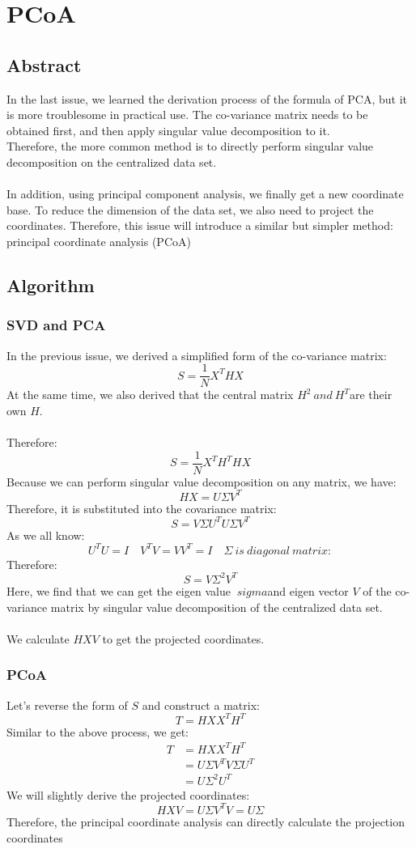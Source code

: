 \documentclass{report}
\begin{document}
\chapter{PCoA}
\section{Abstract}
In the last issue, we learned the derivation process of the formula of PCA, but it is more troublesome in practical use. The co-variance matrix needs to be obtained first, and then apply singular value decomposition to it. \\
Therefore, the more common method is to directly perform singular value decomposition on the centralized data set.\\\\
In addition, using principal component analysis, we finally get a new coordinate base. To reduce the dimension of the data set, we also need to project the coordinates. Therefore, this issue will introduce a similar but simpler method: principal coordinate analysis (PCoA)
\section{Algorithm}
\subsection{SVD and PCA}
In the previous issue, we derived a simplified form of the co-variance matrix:
$$
S=\frac{1}{N} X^T H X
$$
At the same time, we also derived that the central matrix $H^2\ and\ H^T $are their own $H $.\\\\
Therefore:
$$
S=\frac{1}{N} X^T H^T H X
$$
Because we can perform singular value decomposition on any matrix, we have:
$$
HX = U \Sigma V^T
$$
Therefore, it is substituted into the covariance matrix:
$$
S = V \Sigma U^T U \Sigma V^T
$$
As we all know:
$$
U^T U=I \quad V^T V = V V^T= I \quad \Sigma \ is \ diagonal\ matrix:
$$
Therefore:
$$
S=V\Sigma ^2 V^T
$$
Here, we find that we can get the eigen value $\ sigma $and eigen vector $V $ of the co-variance matrix by singular value decomposition of the centralized data set.\\\\
We calculate $HXV $ to get the projected coordinates.
\subsection{PCoA}
Let's reverse the form of $S $ and construct a matrix:
$$
T=HXX^TH^T
$$
Similar to the above process, we get:
$$
\begin{aligned}
T&=HXX^TH^T\\
&=U\Sigma V^T V\Sigma U^T\\
&=U\Sigma^2 U^T
\end{aligned}
$$
We will slightly derive the projected coordinates:
$$
HXV=U\Sigma V^TV=U\Sigma
$$
Therefore, the principal coordinate analysis can directly calculate the projection coordinates
\end{document}
